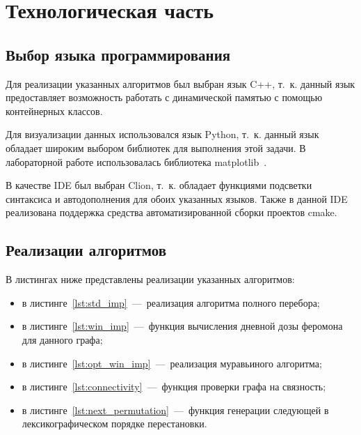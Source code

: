 \chapter{Технологическая часть}

\section{Выбор языка программирования}

Для реализации указанных алгоритмов был выбран язык C++, т.~к. данный язык предоставляет возможность работать с динамической памятью с помощью контейнерных классов.

Для визуализации данных использовался язык Python, т.~к. данный язык обладает широким выбором библиотек для выполнения этой задачи. В лабораторной работе использовалась библиотека matplotlib~\cite{plt}.

В качестве IDE был выбран Clion, т.~к. обладает функциями подсветки синтаксиса и автодополнения для обоих указанных языков. Также в данной IDE реализована поддержка средства автоматизированной сборки проектов cmake.

\section{Реализации алгоритмов}

В листингах ниже представлены реализации указанных алгоритмов:
\begin{itemize}[label=---]
	\item в листинге~\ref{lst:std_imp}~---~реализация алгоритма полного перебора;
	\item в листинге~\ref{lst:win_imp}~---~функция вычисления дневной дозы феромона для данного графа;
	\item в листинге~\ref{lst:opt_win_imp}~---~реализация муравьиного алгоритма;
	\item в листинге~\ref{lst:connectivity}~---~функция проверки графа на связность;
	\item в листинге~\ref{lst:next_permutation}~---~функция генерации следующей в лексикографическом порядке перестановки.
\end{itemize}

